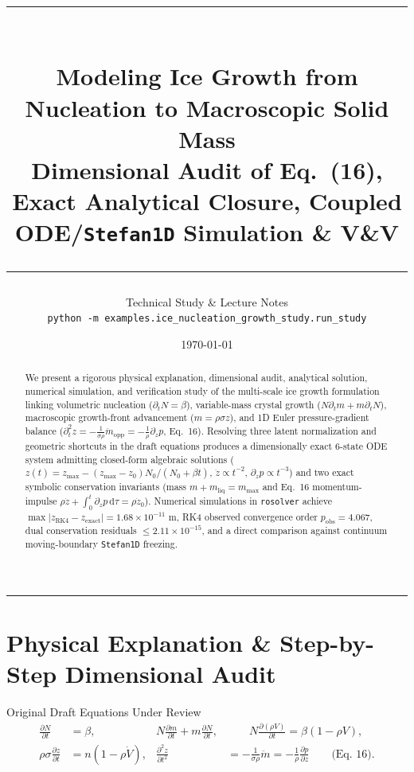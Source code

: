 \documentclass[11pt,a4paper]{article}
\title{
  {\color{navy}\rule{\textwidth}{1.8pt}}\\[0.6em]
  {\LARGE\bfseries\color{navy} Modeling Ice Growth from Nucleation to Macroscopic Solid Mass}\\[0.35em]
  {\large\color{slate} Dimensional Audit of Eq.~(16), Exact Analytical Closure, Coupled ODE/\texttt{Stefan1D} Simulation \& V\&V}\\[0.4em]
  {\color{navy}\rule{\textwidth}{0.8pt}}
}
\author{Technical Study \& Lecture Notes\\[2pt]{\small\texttt{python -m examples.ice\_nucleation\_growth\_study.run\_study}}}
\date{\today}
\newcommand{\dd}{\mathrm{d}}
\newcommand{\pd}[2]{\frac{\partial #1}{\partial #2}}
\begin{document}
\maketitle

\begin{abstract}
\noindent We present a rigorous physical explanation, dimensional audit, analytical solution, numerical simulation, and verification study of the multi-scale ice growth formulation linking volumetric nucleation ($\partial_t N = \beta$), variable-mass crystal growth ($N\partial_t m + m\partial_t N$), macroscopic growth-front advancement ($m = \rho\sigma z$), and 1D Euler pressure-gradient balance ($\partial_t^2 z = -\frac{1}{\sigma\rho}\ddot{m}_{\mathrm{opp}} = -\frac{1}{\rho}\partial_z p$, Eq.~16). Resolving three latent normalization and geometric shortcuts in the draft equations produces a dimensionally exact 6-state ODE system admitting closed-form algebraic solutions ($z(t) = z_{\max} - (z_{\max}-z_0)N_0/(N_0+\beta t)$, $\dot{z}\propto t^{-2}$, $\partial_z p \propto t^{-3}$) and two exact symbolic conservation invariants (mass $m + m_{\mathrm{liq}} = m_{\max}$ and Eq.~16 momentum-impulse $\rho\dot{z} + \int_0^t \partial_z p\,\dd\tau = \rho\dot{z}_0$). Numerical simulations in \texttt{rosolver} achieve $\max|z_{\mathrm{RK4}} - z_{\mathrm{exact}}| = 1.68\times 10^{-11}\text{ m}$, RK4 observed convergence order $p_{\mathrm{obs}} = 4.067$, dual conservation residuals $\le 2.11\times 10^{-15}$, and a direct comparison against continuum moving-boundary \texttt{Stefan1D} freezing.
\end{abstract}

\tableofcontents
\vspace{0.8em}
\hrule
\vspace{1em}

\section{Physical Explanation \& Step-by-Step Dimensional Audit}

\begin{setupbox}{Original Draft Equations Under Review}
\begin{align*}
  \pd{N}{t} &= \beta,
  & N\pd{m}{t} + m\pd{N}{t},
  & \qquad N\pd{(\rho V)}{t} = \beta(1 - \rho V),\\
  \rho\sigma\pd{z}{t} &= n(1 - \rho\dot{V}),
  & \pd{^2 z}{t^2} &= -\frac{1}{\sigma\rho}\ddot{m} = -\frac{1}{\rho}\pd{p}{z} \qquad\text{(Eq.~16)}.
\end{align*}
\end{setupbox}
\end{document}

